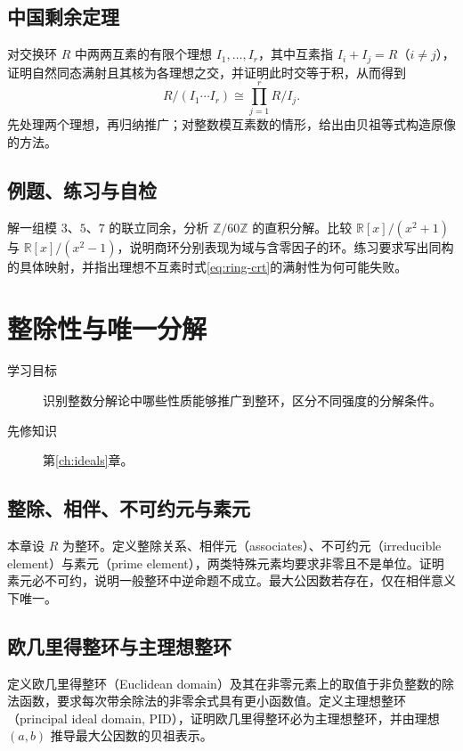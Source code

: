 \documentclass[UTF8,12pt,a4paper,fontset=fandol]{ctexbook}
\begin{document}
\section{中国剩余定理}
对交换环 $R$ 中两两互素的有限个理想 $I_1,\ldots,I_r$，其中互素指 $I_i+I_j=R$（$i\ne j$），证明自然同态满射且其核为各理想之交，并证明此时交等于积，从而得到
\begin{equation}\label{eq:ring-crt}
  R/(I_1\cdots I_r)\cong\prod_{j=1}^{r}R/I_j.
\end{equation}
先处理两个理想，再归纳推广；对整数模互素数的情形，给出由贝祖等式构造原像的方法。

\section{例题、练习与自检}
解一组模 $3$、$5$、$7$ 的联立同余，分析 $\mathbb Z/60\mathbb Z$ 的直积分解。比较 $\mathbb R[x]/(x^2+1)$ 与 $\mathbb R[x]/(x^2-1)$，说明商环分别表现为域与含零因子的环。练习要求写出同构的具体映射，并指出理想不互素时式\eqref{eq:ring-crt}的满射性为何可能失败。

\chapter{整除性与唯一分解}\label{ch:factorization}

\begin{description}
  \item[学习目标] 识别整数分解论中哪些性质能够推广到整环，区分不同强度的分解条件。
  \item[先修知识] 第\ref{ch:ideals}章。
\end{description}

\section{整除、相伴、不可约元与素元}
本章设 $R$ 为整环。定义整除关系、相伴元（associates）、不可约元（irreducible element）与素元（prime element），两类特殊元素均要求非零且不是单位。证明素元必不可约，说明一般整环中逆命题不成立。最大公因数若存在，仅在相伴意义下唯一。

\section{欧几里得整环与主理想整环}
定义欧几里得整环（Euclidean domain）及其在非零元素上的取值于非负整数的除法函数，要求每次带余除法的非零余式具有更小函数值。定义主理想整环（principal ideal domain, PID），证明欧几里得整环必为主理想整环，并由理想 $(a,b)$ 推导最大公因数的贝祖表示。
\end{document}
